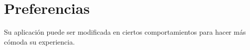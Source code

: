 \chapter{Preferencias}
\label{sec:preferencias}
Su aplicaci\'on puede ser modificada en ciertos comportamientos para hacer
m\'as c\'omoda su experiencia.


